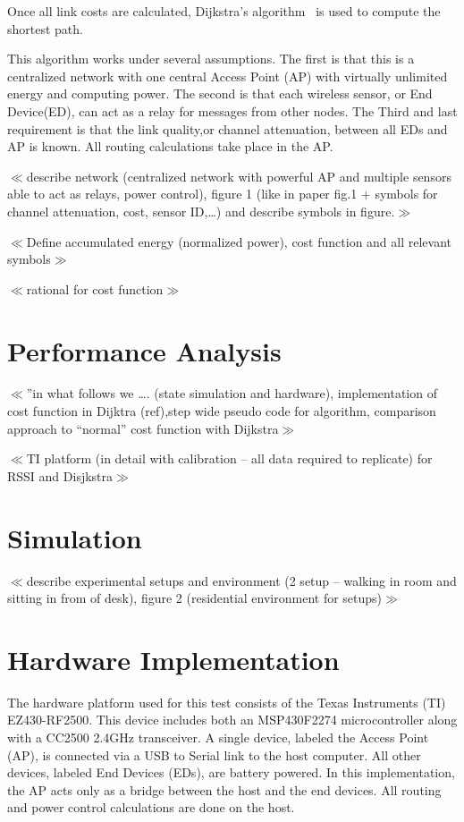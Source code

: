 \documentclass{article}
\begin{document}
Once all link costs are calculated, Dijkstra's algorithm~\cite{dijkstra:algorithm} is used to compute the shortest path.

This algorithm works under several assumptions. The first is that this is a centralized network with one central Access Point (AP) with virtually unlimited energy and  computing power. The second is that each wireless sensor, or End Device(ED), can act as a relay for messages from other nodes. The Third and last requirement is that the link quality,or channel attenuation, between all EDs and AP is known. All routing calculations take place in the AP.

$\ll$describe network (centralized network with powerful AP and multiple sensors able to act as relays, power control), figure 1 (like in paper fig.1 + symbols for channel attenuation, cost, sensor ID,…) and describe symbols in figure.$\gg$

$\ll$Define accumulated energy (normalized power), cost function and all relevant symbols$\gg$

$\ll$rational for cost function$\gg$

\section{Performance Analysis}
$\ll$”in what follows we …. (state simulation and hardware), implementation of cost function in Dijktra (ref),step wide pseudo code for algorithm, comparison approach to “normal” cost function with Dijkstra$\gg$

$\ll$TI platform (in detail with calibration – all data required to replicate) for RSSI and Disjkstra$\gg$

\section{Simulation}
$\ll$describe experimental setups and environment (2 setup – walking in room and sitting in from of desk), figure 2 (residential environment for setups)$\gg$

\section{Hardware Implementation}
The hardware platform used for this test consists of the Texas Instruments (TI) EZ430-RF2500. This device includes both an MSP430F2274 microcontroller along with a CC2500 2.4GHz transceiver. A single device, labeled the Access Point (AP), is connected via a USB to Serial link to the host computer. All other devices, labeled End Devices (EDs), are battery powered. In this implementation, the AP acts only as a bridge between the host and the end devices. All routing and power control calculations are done on the host.
\end{document}
